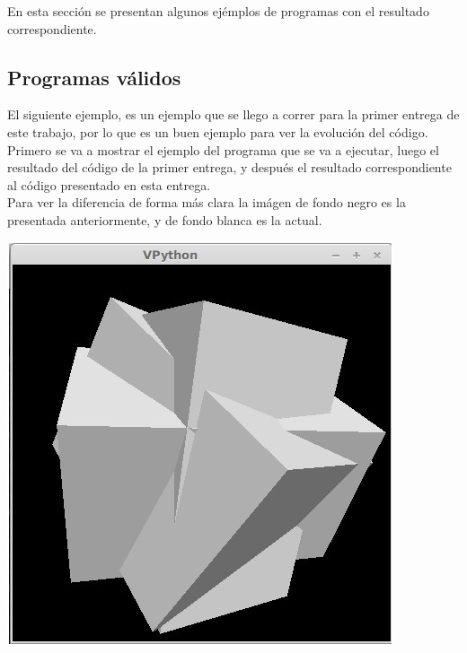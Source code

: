 En esta secci\'on se presentan algunos ej\'emplos de programas con el resultado correspondiente.

\subsection{Programas v\'alidos}

El siguiente ejemplo, es un ejemplo que se llego a correr para la primer entrega de este trabajo, por lo que es un buen ejemplo para ver la evoluci\'on del c\'odigo. \\
Primero se va a mostrar el ejemplo del programa que se va a ejecutar, luego el resultado del c\'odigo de la primer entrega, y despu\'es el resultado correspondiente al c\'odigo presentado en esta entrega.\\
Para ver la diferencia de forma m\'as clara la im\'agen de fondo negro es la presentada anteriormente, y de fondo blanca es la actual.\\




\centerline{\includegraphics[scale=0.40]{../imagenes/eg04.jpg}}


